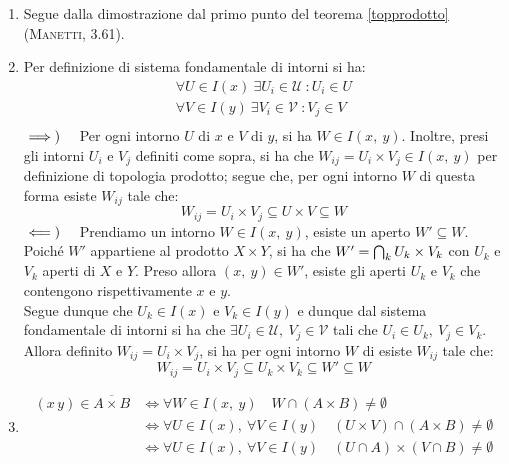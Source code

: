 \begin{demonstration}
\begin{enumerate}[label=\Roman*]
\item Segue dalla dimostrazione dal primo punto del teorema \ref{topprodotto} (\textsc{Manetti, 3.61}).
\item Per definizione di sistema fondamentale di intorni si ha:
\begin{gather*}
\forall U\in I\left(x\right)\ \exists U_i\in\mathcal{U}\ \colon U_i\in U\\
\forall V\in I\left(y\right)\ \exists V_i\in\mathcal{V}\ \colon V_j\in V\\
\end{gather*}
$\implies)\quad$ Per ogni intorno $U$ di $x$ e $V$ di $y$, si ha $W\in I\left(x,\ y\right)$. Inoltre, presi gli intorni $U_i$ e $V_j$ definiti come sopra, si ha che $W_{ij} = U_i \times V_j\in I\left(x,\ y\right)$ per definizione di topologia prodotto; segue che, per ogni intorno $W$ di questa forma esiste $W_{ij}$ tale che:
\begin{equation*}
W_{ij} = U_i \times V_j\subseteq U\times V\subseteq W
\end{equation*}
$\impliedby)\quad$ Prendiamo un intorno $W\in I\left(x,\ y\right)$, esiste un aperto $W'\subseteq W$. Poiché $W'$ appartiene al prodotto $X\times Y$, si ha che $W'=\mathop{{\bigcap}}\displaylimits_k U_k\times V_k$ con $U_k$ e $V_k$ aperti di $X$ e $Y$. Preso allora $\left(x,\ y\right)\in W'$, esiste gli aperti $U_k$ e $V_k$ che contengono rispettivamente $x$ e $y$.\\
Segue dunque che $U_k\in I\left(x\right)$ e $V_k\in I\left(y\right)$ e dunque dal sistema fondamentale di intorni si ha che $\exists U_i\in\mathcal{U},\ V_j\in\mathcal{V}$ tali che $U_i\in U_k,\  V_j\in V_k$. Allora definito $W_{ij} = U_i \times V_j$, si ha per ogni intorno $W$ di esiste $W_{ij}$ tale che:
\begin{equation*}
	W_{ij} = U_i \times V_j\subseteq U_k\times V_k\subseteq W'\subseteq W
\end{equation*}
\item \begin{align*}
\left(x\, y\right)\in \overline{A\times B}&\iff \forall W\in I\left(x,\ y\right)\quad W\cap\left(A\times B\right)\neq \emptyset\\
&\iff \forall U\in I\left(x\right),\ \forall V\in I\left(y\right)\quad \left(U\times V\right)\cap\left(A\times B\right)\neq \emptyset\\
&\iff \forall U\in I\left(x\right),\ \forall V\in I\left(y\right)\quad \left(U\cap A\right)\times\left(V\cap B\right)\neq \emptyset\\

\end{align*}
\end{enumerate}
\end{demonstration}
